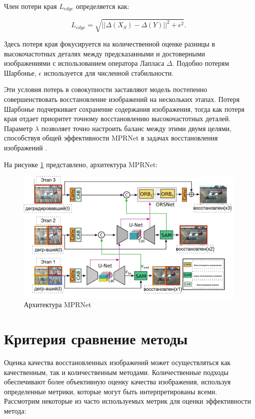 Член потери края \( L_{edge} \) определяется как:

\begin{equation}
	L_{edge} = \sqrt{\vert\vert\Delta(X_S) - \Delta(Y)\vert\vert^2 + \epsilon^2}.
\end{equation}

Здесь потеря края фокусируется на количественной оценке разницы в высокочастотных деталях между предсказанными и достоверными изображениями с использованием оператора Лапласа \(\Delta\). Подобно потерям Шарбонье, \( \epsilon \) используется для численной стабильности.

Эти условия потерь в совокупности заставляют модель постепенно совершенствовать восстановление изображений на нескольких этапах. Потеря Шарбонье подчеркивает сохранение содержания изображения, тогда как потеря края отдает приоритет точному восстановлению высокочастотных деталей. Параметр \( \lambda \) позволяет точно настроить баланс между этими двумя целями, способствуя общей эффективности MPRNet в задачах восстановления \\ изображений \cite{zamir2021multi}.

На рисунке \ref{fig:MPRNet} представлено, архитектура MPRNet:
\begin{figure}[H]
	\centering
	\includegraphics[width=1\linewidth]{assets/MPRNet.png}
	\caption{Архитектура MPRNet}
	\label{fig:MPRNet}
\end{figure}

\section{Критерия сравнение методы}

Оценка качества восстановленных изображений может осуществляться как качественным, так и количественным методами. Количественные подходы обеспечивают более объективную оценку качества изображения, используя определенные метрики, которые могут быть интерпретированы всеми. Рассмотрим некоторые из часто используемых метрик для оценки эффективности метода:


